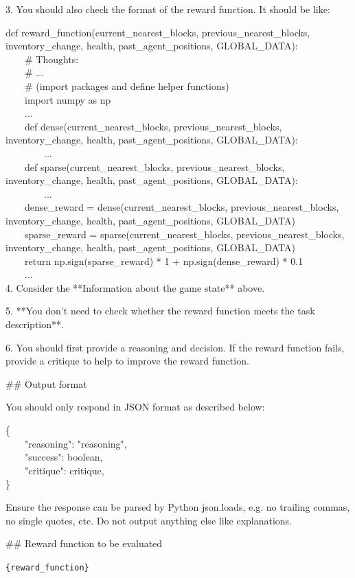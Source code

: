 3. You should also check the format of the reward function. It should be like:





def reward\_function(current\_nearest\_blocks, previous\_nearest\_blocks, inventory\_change, health, past\_agent\_positions, GLOBAL\_DATA):
\\
\hbox{\ \ \ \ }\# Thoughts:\\
\hbox{\ \ \ \ }\# ...\\
\hbox{\ \ \ \ }\# (import packages and define helper functions)\\
\hbox{\ \ \ \ }import numpy as np\\
\hbox{\ \ \ \ }...\\
\hbox{\ \ \ \ }def dense(current\_nearest\_blocks, previous\_nearest\_blocks, inventory\_change, health, past\_agent\_positions, GLOBAL\_DATA):\\
\hbox{\ \ \ \ \ \ \ \ }...\\
\hbox{\ \ \ \ }def sparse(current\_nearest\_blocks, previous\_nearest\_blocks, inventory\_change, health, past\_agent\_positions, GLOBAL\_DATA):\\
\hbox{\ \ \ \ \ \ \ \ }...\\
\hbox{\ \ \ \ }dense\_reward = dense(current\_nearest\_blocks, previous\_nearest\_blocks, inventory\_change, health, past\_agent\_positions, GLOBAL\_DATA)\\
\hbox{\ \ \ \ }sparse\_reward = sparse(current\_nearest\_blocks, previous\_nearest\_blocks, inventory\_change, health, past\_agent\_positions, GLOBAL\_DATA)\\
\hbox{\ \ \ \ }return np.sign(sparse\_reward) * 1 + np.sign(dense\_reward) * 0.1\\
\hbox{\ \ \ \ }...\\
4. Consider the **Information about the game state** above.

5. **You don't need to check whether the reward function meets the task description**.

6. You should first provide a reasoning and decision. If the reward function fails, provide a critique to help to improve the reward function.



\#\# Output format

You should only respond in JSON format as described below:

\{
\\
\hbox{\ \ \ \ }"reasoning": "reasoning",\\
\hbox{\ \ \ \ }"success": boolean,\\
\hbox{\ \ \ \ }"critique": critique,\\
\}



Ensure the response can be parsed by Python \textasciigrave json.loads\textasciigrave  , e.g. no trailing commas, no single quotes, etc. Do not output anything else like explanations.



\#\# Reward function to be evaluated



\texttt{\{reward\_function\}}




